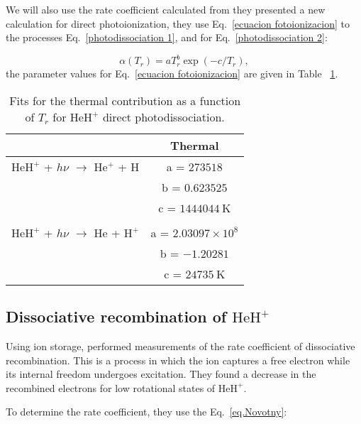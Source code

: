 \documentclass[baaa]{baaa}
\begin{document}
We will also use the rate coefficient calculated from \citet{Coppola2017} they presented a new calculation for direct photoionization, they use Eq.~\ref{ecuacion fotoionizacion} to the processes Eq.~\ref{photodissociation 1}, and for Eq.~\ref{photodissociation 2}:


\begin{equation} \label{ecuacion fotoionizacion}
\alpha({T_r})  =  a T_r^b \exp(-c/T_r),  
\end{equation}
the parameter values for Eq.~\ref{ecuacion fotoionizacion} are given in Table ~\ref{Parameters value of photodissociation}.

\begin{table}[h!]
    \centering
    \begin{tabular}{lc} 
    \hline\hline\noalign{\smallskip}
            & Thermal \\ 
        \hline\noalign{\smallskip}
        $\mathrm{HeH^+}$ + $h\nu$ $\longrightarrow$ $\mathrm{He^+}$ + $\mathrm{H}$ &   a = $273518$ \\
        & b = $0.623525$ \\
        & c = $1444044~\mathrm{K}$\\
        & \\

        $\mathrm{HeH^+}$ + $h\nu$ $\longrightarrow$ $\mathrm{He}$ + $\mathrm{H^+}$ &   a = $2.03097 \times 10^8$ \\
        & b = $-1.20281$ \\
        & c = $24735~\mathrm{K}$ \\
        \hline

    \end{tabular}
    \caption{Fits for the thermal contribution as a function of $T_r$ for $\mathrm{HeH^+}$ direct photodissociation.}
    \label{Parameters value of photodissociation}
\end{table}


\subsection{Dissociative recombination of $\mathrm{HeH^+}$}
Using ion storage, \citet{Novotny2019}  performed measurements of the rate coefficient of dissociative recombination. This is a process in which the ion captures a free electron while its internal freedom undergoes excitation. They found a decrease in the recombined electrons for low rotational states of $\mathrm{HeH^+}$.

To determine the rate coefficient, they use the Eq.~\ref{eq.Novotny}:
\end{document}
